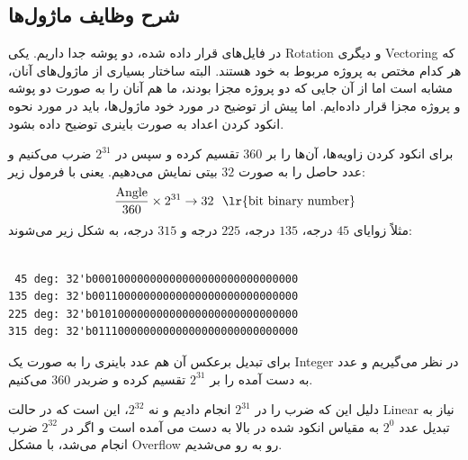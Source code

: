 \documentclass[12pt,titlepage,a4page , tikz , multi,table , svgnames,xcdraw]{article}
\begin{document}
\begin{landscape}
\thispagestyle{empty}


\end{landscape}

\begin{landscape}
\thispagestyle{empty}


\end{landscape}

\begin{landscape}
\thispagestyle{empty}


\end{landscape}


\subsection{شرح وظایف ماژول‌ها}

در فایل‌های قرار داده شده، دو پوشه جدا داریم. یکی Rotation و دیگری Vectoring که هر کدام مختص به پروژه مربوط به خود هستند. البته ساختار بسیاری از ماژول‌های آنان، مشابه است اما از آن جایی که دو پروژه مجزا بودند، ما هم آنان را به صورت دو پوشه و پروژه مجزا قرار داده‌ایم. اما پیش از توضیح در مورد خود ماژول‌ها، باید در مورد نحوه انکود کردن اعداد به صورت باینری توضیح داده بشود.

برای انکود کردن زاویه‌ها، آن‌ها را بر $360$ تقسیم کرده و سپس در $2^{31}$ ضرب می‌کنیم و عدد حاصل را به صورت $32$ بیتی نمایش می‌دهیم. یعنی با فرمول زیر:
$$\frac{\text{Angle}}{360} \times 2^{31} \rightarrow 32 ~~\text{\lr{bit binary number}}$$
 مثلاً زوایای $45$ درجه، $135$ درجه، $225$ درجه و $315$ درجه، به شکل زیر می‌شوند:

\begin{latin}
\begin{verbatim}

 45 deg: 32'b00010000000000000000000000000000
135 deg: 32'b00110000000000000000000000000000
225 deg: 32'b01010000000000000000000000000000
315 deg: 32'b01110000000000000000000000000000

\end{verbatim}
\end{latin} 

برای تبدیل برعکس آن هم عدد باینری را به صورت یک Integer در نظر می‌گیریم و عدد به دست آمده را بر $2^{31}$ تقسیم کرده و ضربدر $360$ می‌کنیم.


دلیل این که ضرب را در $2^{31}$ انجام دادیم و نه $2^{32}$، این است که در حالت Linear نیاز به  تبدیل عدد $2^{0}$ به مقیاس انکود شده در بالا به دست می آمده است و اگر در $2^{32}$ ضرب انجام می‌شد، با مشکل Overflow رو به رو می‌شدیم.
\end{document}

